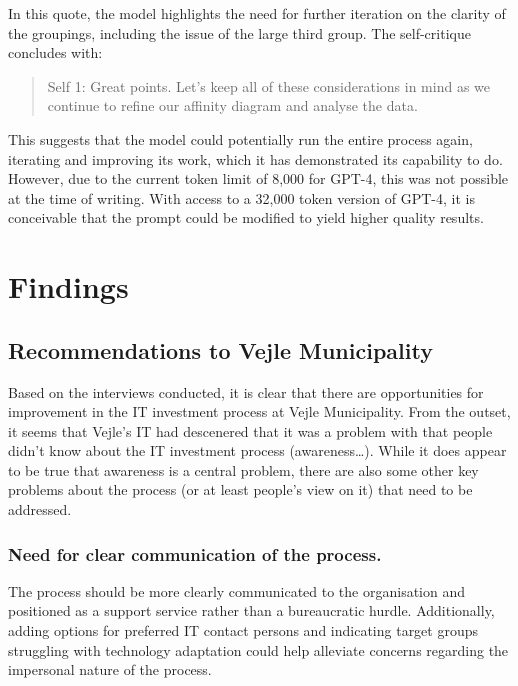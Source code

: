 \documentclass[
]{book}
\begin{document}
In this quote, the model highlights the need for further iteration on the clarity of the groupings, including the issue of the large third group. The self-critique concludes with:

\begin{quote}
Self 1: Great points. Let's keep all of these considerations in mind as we continue to refine our affinity diagram and analyse the data.
\end{quote}

This suggests that the model could potentially run the entire process again, iterating and improving its work, which it has demonstrated its capability to do. However, due to the current token limit of 8,000 for GPT-4, this was not possible at the time of writing. With access to a 32,000 token version of GPT-4, it is conceivable that the prompt could be modified to yield higher quality results.

\hypertarget{findings}{%
\section{Findings}\label{findings}}

\hypertarget{recommendations-to-vejle-municipality}{%
\subsection{Recommendations to Vejle Municipality}\label{recommendations-to-vejle-municipality}}

Based on the interviews conducted, it is clear that there are opportunities for improvement in the IT investment process at Vejle Municipality. From the outset, it seems that Vejle's IT had descenered that it was a problem with that people didn't know about the IT investment process (awareness\ldots). While it does appear to be true that awareness is a central problem, there are also some other key problems about the process (or at least people's view on it) that need to be addressed.

\hypertarget{need-for-clear-communication-of-the-process.}{%
\subsubsection{Need for clear communication of the process.}\label{need-for-clear-communication-of-the-process.}}

The process should be more clearly communicated to the organisation and positioned as a support service rather than a bureaucratic hurdle. Additionally, adding options for preferred IT contact persons and indicating target groups struggling with technology adaptation could help alleviate concerns regarding the impersonal nature of the process.
\end{document}
